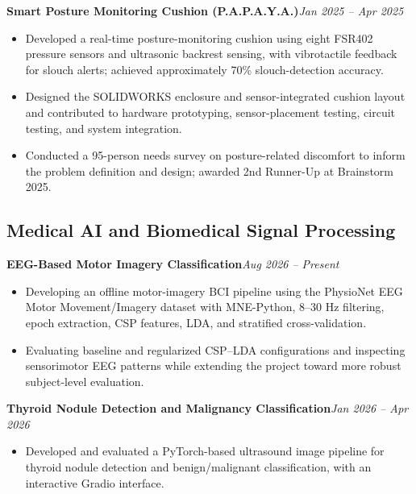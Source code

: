 \documentclass[10pt,a4paper]{article}
\newcommand{\gh}[1]{\href{#1}{\faGithub}}
\newcommand{\projecttitle}[3]{%
\textbf{#1}\hspace{3pt}#2\hfill\textit{#3}\\[-2pt]
}
\begin{document}
\projecttitle{Smart Posture Monitoring Cushion (P.A.P.A.Y.A.)}
{\gh{https://github.com/Abdul-Rahman-bme/PulseCode-Posture-Cushion-P.A.P.A.Y.A-}}
{Jan 2025 -- Apr 2025}
\begin{itemize}
    \item Developed a real-time posture-monitoring cushion using eight FSR402 pressure sensors and ultrasonic backrest sensing, with vibrotactile feedback for slouch alerts; achieved approximately 70\% slouch-detection accuracy.
    \item Designed the SOLIDWORKS enclosure and sensor-integrated cushion layout and contributed to hardware prototyping, sensor-placement testing, circuit testing, and system integration.
    \item Conducted a 95-person needs survey on posture-related discomfort to inform the problem definition and design; awarded 2nd Runner-Up at Brainstorm 2025.
\end{itemize}

\subsection*{Medical AI and Biomedical Signal Processing}

\projecttitle{EEG-Based Motor Imagery Classification}
{\gh{https://github.com/Abdul-Rahman-bme/EEG-BCI-project}}
{Aug 2026 -- Present}
\begin{itemize}
    \item Developing an offline motor-imagery BCI pipeline using the PhysioNet EEG Motor Movement/Imagery dataset with MNE-Python, 8--30 Hz filtering, epoch extraction, CSP features, LDA, and stratified cross-validation.
    \item Evaluating baseline and regularized CSP--LDA configurations and inspecting sensorimotor EEG patterns while extending the project toward more robust subject-level evaluation.
\end{itemize}

\projecttitle{Thyroid Nodule Detection and Malignancy Classification}
{\gh{https://github.com/Abdul-Rahman-bme/Thyroid-nodule-detection-and-classification}}
{Jan 2026 -- Apr 2026}
\begin{itemize}
    \item Developed and evaluated a PyTorch-based ultrasound image pipeline for thyroid nodule detection and benign/malignant classification, with an interactive Gradio interface.
\end{itemize}
\end{document}
